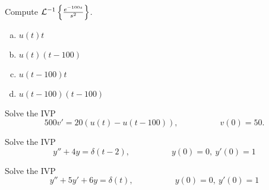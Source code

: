 \begin{applicationActivities}
\begin{activity}{5}
Compute \(\mathcal{L}^{-1} \left\{ \frac{e^{-100s}}{s^2}\right\} \).
\begin{enumerate}[(a)]
\item \(u(t)t\)
\item \(u(t)(t-100)\)
\item \(u(t-100)t\)
\item \(u(t-100)(t-100)\)
\end{enumerate}
\end{activity}



\begin{activity}{10}
Solve the IVP
\[ 500v' = 20 \left( u(t)-u(t-100)\right), \hspace{5em} v(0)=50.\]
\end{activity}

\begin{activity}{10}
Solve the IVP
\[y''+4y=\delta(t-2), \hspace{5em} y(0)=0,\ y'(0)=1\]
\end{activity}

\begin{activity}{15}
Solve the IVP
\[y''+5y'+6y=\delta(t), \hspace{5em} y(0)=0,\ y'(0)=1\]
\end{activity}



\end{applicationActivities}
